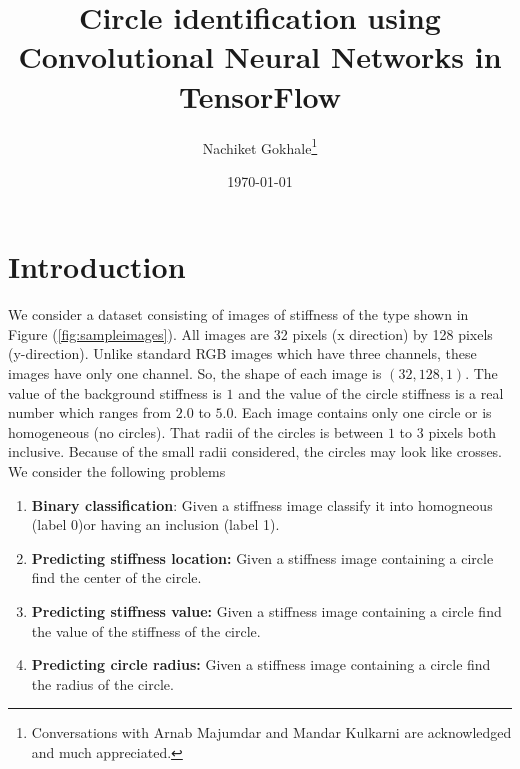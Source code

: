 \documentclass{article}
\begin{document}
\title{Circle identification using Convolutional Neural Networks in TensorFlow}
\author{Nachiket Gokhale\footnote{Conversations with Arnab Majumdar and Mandar Kulkarni are acknowledged and much appreciated.}}
\date{\today}
\maketitle
\section{Introduction}
We consider a dataset consisting of images of stiffness of the type shown in Figure (\ref{fig:sampleimages}). All images are 32 pixels (x direction) by 128 pixels (y-direction). Unlike standard RGB images which have three channels, these images have only one channel. So, the shape of each image is $(32,128,1)$. The value of the background stiffness is $1$ and the value of the circle stiffness is a real number which ranges from $2.0$ to $5.0$. Each image contains only one circle or is homogeneous (no circles). That radii of the circles is between $1$ to $3$ pixels both inclusive. Because of the small radii considered, the circles may look like crosses.\\
We consider the following problems
\begin{enumerate}
\item{\textbf{Binary classification}: Given a stiffness image classify it into homogneous (label 0)or having an inclusion (label 1).}
\item{\textbf{Predicting stiffness location:} Given a stiffness image containing a circle find the center of the circle.}
\item{\textbf{Predicting stiffness value:} Given a stiffness image containing a circle find the value of the stiffness of the circle.}
\item{\textbf{Predicting circle radius:} Given a stiffness image containing a circle find the radius of the circle.}
\end{enumerate}
\end{document}
